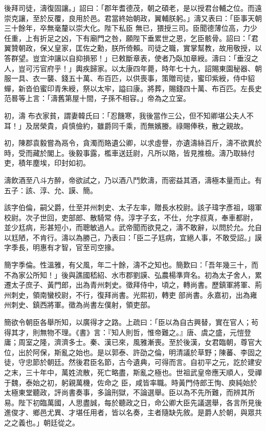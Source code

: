 \begin{pinyinscope}
 後拜司徒，濤復固讓。」詔曰：「郡年耆德茂，朝之碩老，是以授君台輔之位。而遠崇克讓，至於反覆，良用於邑。君當終始朝政，翼輔朕躬。」濤又表曰：「臣事天朝三十餘年，卒無毫釐以崇大化。陛下私臣
 無已，猥授三司。臣聞德薄位高，力少任重，上有折足之凶，下有廟門之咎，願陛下垂累世之恩，乞臣骸骨。詔曰：「君翼贊朝政，保乂皇家，匡佐之勳，朕所倚賴。司徒之職，實掌幫教，故用敬授，以答群望。豈宜沖讓以自抑損邪！」已敕斷章表，使者乃臥加章綬。濤曰：「垂沒之人，豈可污官府乎！」輿疾歸家。以太康四年薨，時年七十九，詔賜東園秘器、朝服一具、衣一襲、錢五十萬、布百匹，以供喪事，策贈司徒，蜜印紫綬，侍中貂蟬，新沓伯蜜印青朱綬，祭以太牢，謚曰康。將葬，賜錢四十萬、布百匹。左長史范晷等上言：「濤舊第屋十間，子孫不相容。」帝為之立室。



 初，濤
 布衣家貧，謂妻韓氏曰：「忍饑寒，我後當作三公，但不知卿堪公夫人不耳！」及居榮貴，貞慎儉約，雖爵同千乘，而無嬪媵。祿賜俸秩，散之親故。



 初，陳郡袁毅嘗為鬲令，貪濁而賂遺公卿，以求虛譽，亦遺濤絲百斤，濤不欲異於時，受而藏於閣上。後毅事露，檻車送廷尉，凡所以賂，皆見推檢。濤乃取絲付吏，積年塵埃，印封如初。



 濤飲酒至八斗方醉，帝欲試之，乃以酒八鬥飲濤，而密益其酒，濤極本量而止。有五子：該、淳、允、謨、簡。



 該字伯倫，嗣父爵，仕至并州刺史、太子左率，贈長水校尉。該子瑋字彥祖，翊軍校尉。次子世回，吏部郎、散騎常
 侍。淳字子玄，不仕，允字叔真，奉車都尉，並少尪病，形甚短小，而聰敏過人。武帝聞而欲見之，濤不敢辭，以問於允。允自以尪陋，不肯行。濤以為勝己，乃表曰：「臣二子尪病，宜絕人事，不敢受詔。」謨字季長，明惠有才智，官至司空掾。



 簡字季倫。性溫雅，有父風，年二十餘，濤不之知也。簡歎曰：「吾年幾三十，而不為家公所知！」後與譙國嵇紹、水市郡劉謨、弘農楊準齊名。初為太子舍人，累遷太子庶子、黃門郎，出為青州刺史。徵拜侍中，頃之，轉尚書。歷鎮軍將軍、荊州刺史，領南蠻校尉，不行，復拜尚書。光熙初，轉吏
 部尚書。永嘉初，出為雍州刺史、鎮西將軍。徵為尚書左僕射，領吏部。



 簡欲令朝臣各舉所知，以廣得才之路。上疏曰：「臣以為自古興替，實在官人；茍得其才，則無物不理。《書》言：『知人則哲，惟帝難之。』唐、虞之盛，元愷登庸；周室之隆，濟濟多士。秦、漢已來，風雅漸喪。至於後漢，女君臨朝，尊官大位，出於阿保，斯亂之始也。是以郭泰、許劭之倫，明清議於草野；陳蕃、李固之徒，守忠節於朝廷。然後君臣名節，古今遺典，可得而言。自初平之元，訖於建安之末，三十年中，萬姓流散，死亡略盡，斯亂之極也。世祖武皇帝應天順人，受禪于魏，泰始之初，躬親萬機，佐命之
 臣，咸皆率職。時黃門侍郎王恂、庾純始於太極東堂聽政，評尚書奏事，多論刑獄，不論選舉。臣以為不先所難，而辨其所易。陛下初臨萬國，人思盡誠，每於聽政之日，命公卿大臣先議選舉，各言所見後進俊才、鄉邑尤異、才堪任用者，皆以名奏，主者隨缺先敘。是爵人於朝，與眾共之之義也。」朝廷從之。




\end{pinyinscope}
